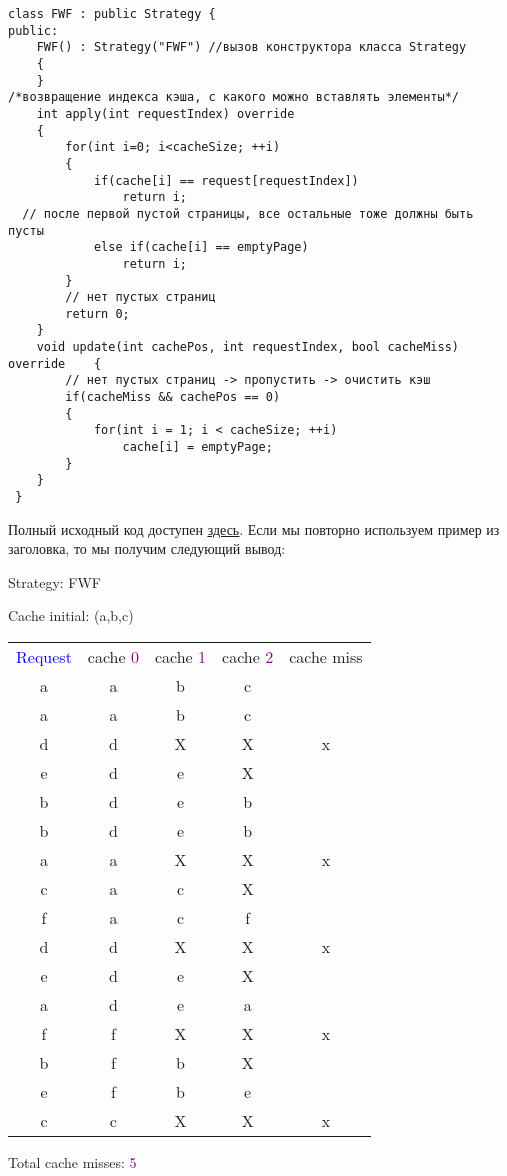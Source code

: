 \begin{tcolorbox}
\begin{verbatim}
class FWF : public Strategy {
public:
	FWF() : Strategy("FWF") //вызов конструктора класса Strategy
	{
	}
/*возвращение индекса кэша, с какого можно вставлять элементы*/
	int apply(int requestIndex) override 
	{
		for(int i=0; i<cacheSize; ++i)
		{
			if(cache[i] == request[requestIndex])
				return i;
  // после первой пустой страницы, все остальные тоже должны быть пусты
			else if(cache[i] == emptyPage)
				return i;
		}
		// нет пустых страниц
		return 0;
	}
	void update(int cachePos, int requestIndex, bool cacheMiss) override	{
		// нет пустых страниц -> пропустить -> очистить кэш
		if(cacheMiss && cachePos == 0)
		{
			for(int i = 1; i < cacheSize; ++i)
				cache[i] = emptyPage;
		}
	}
 }

\end{verbatim}
\end{tcolorbox}

Полный исходный код доступен \href{https://pastebin.com/AF7EC2xJ}{\underline{здесь}}. Если мы повторно используем пример из заголовка, то мы получим следующий вывод:

\begin{tcolorbox}
{
Strategy: FWF

\vspace{\baselineskip}

Cache initial: (a,b,c)

\vspace{\baselineskip}
\begin{tabular}{*{5}{c}}
\textcolor{Blue}{Request} & cache \textcolor{Purple}{0} & cache \textcolor{Purple}{1} & cache \textcolor{Purple}{2} & cache miss \\
a & a & b & c & \ \\
a & a & b & c & \ \\
d & d & X & X & x \\
e & d & e & X & \ \\
b & d & e & b & \ \\
b & d & e & b & \ \\
a & a & X & X & x \\
c & a & c & X & \ \\
f & a & c & f & \ \\
d & d & X & X & x \\
e & d & e & X & \ \\
a & d & e & a & \ \\
f & f & X & X & x \\
b & f & b & X & \ \\
e & f & b & e & \ \\
c & c & X & X & x \\
\end{tabular}

\vspace{\baselineskip}

Total cache misses: \textcolor{Purple}{5}}
\end{tcolorbox}


